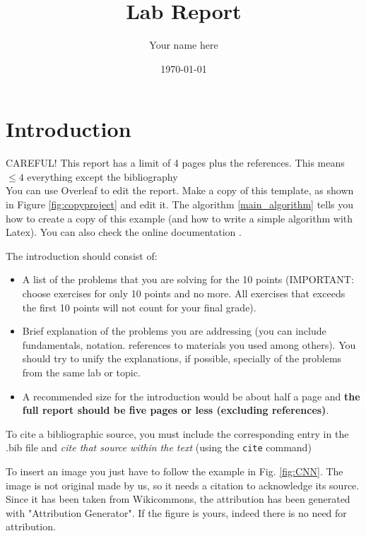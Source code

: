 \documentclass[twocolumn]{article}
\title{Lab Report}
\author{Your name here}
\date{\today}   %
\begin{document}
\maketitle

\section{Introduction}

{\color{red} CAREFUL! This report has a limit of 4 pages plus the references. This means $\leq 4$ everything except the bibliography }\\

You can use Overleaf to edit the report. Make a copy of this template, as shown in Figure \ref{fig:copyproject} and edit it. The algorithm \ref{main_algorithm} tells you how to create a copy of this example (and how to write a simple algorithm with Latex). You can also check the online documentation \cite{OverleafHelp}.

The introduction should consist of:
\begin{itemize}
    \item A list of the problems that you are solving for the 10 points (IMPORTANT: choose exercises for only 10 points and no more. All exercises that exceeds the first 10 points will not count for your final grade).
    \item Brief explanation of the problems you are addressing (you can include fundamentals, notation. references to materials you used among others). You should try to unify the explanations, if possible, specially of the problems from the same lab or topic.
    \item A recommended size for the introduction would be about half a page and \textbf{the full report should be five pages or less (excluding references)}.
\end{itemize}

To cite a bibliographic source, you must include the corresponding entry in the .bib file and \emph{cite that source within the text} \cite{OverleafBibTexHelp} (using the \texttt{cite} command)


To insert an image you just have to follow the example in Fig. \ref{fig:CNN}. The image is not original made by us, so it needs a citation to acknowledge its source. Since it has been taken from Wikicommons, the attribution has been generated with "Attribution Generator"\cite{AttributionGenerator}.
  If the figure is yours, indeed there is no need for attribution. \\
\end{document}
